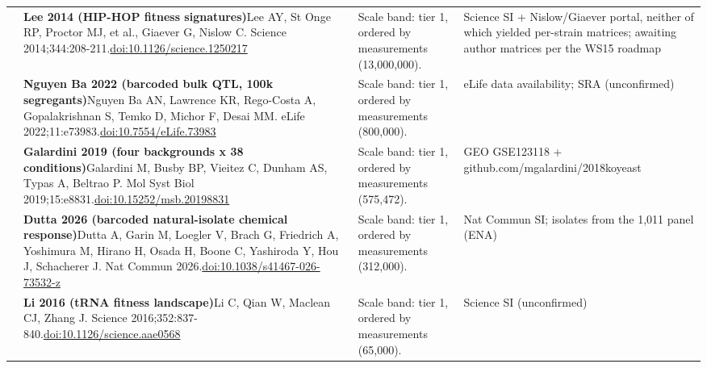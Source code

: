\begin{landscape}
\begin{longtable}{@{}r@{\hspace{4pt}} L{86mm} L{92mm} L{62mm}@{}}
 & \textbf{Lee 2014 (HIP-HOP fitness signatures)}\newline Lee AY, St Onge RP, Proctor MJ, et al., Giaever G, Nislow C. Science 2014;344:208-211.\newline \href{https://doi.org/10.1126/science.1250217}{doi:10.1126/\allowbreak science.1250217} & Scale band: tier 1, ordered by measurements (13,000,000). & Science SI + Nislow/\allowbreak Giaever portal, neither of which yielded per-strain matrices; awaiting author matrices per the WS15 roadmap \\
 & \textbf{Nguyen Ba 2022 (barcoded bulk QTL, 100k segregants)}\newline Nguyen Ba AN, Lawrence KR, Rego-Costa A, Gopalakrishnan S, Temko D, Michor F, Desai MM. eLife 2022;11:e73983.\newline \href{https://doi.org/10.7554/eLife.73983}{doi:10.7554/\allowbreak eLife.73983} & Scale band: tier 1, ordered by measurements (800,000). & eLife data availability; SRA (unconfirmed) \\
 & \textbf{Galardini 2019 (four backgrounds x 38 conditions)}\newline Galardini M, Busby BP, Vieitez C, Dunham AS, Typas A, Beltrao P. Mol Syst Biol 2019;15:e8831.\newline \href{https://doi.org/10.15252/msb.20198831}{doi:10.15252/\allowbreak msb.20198831} & Scale band: tier 1, ordered by measurements (575,472). & GEO GSE123118 + github.com/\allowbreak mgalardini/\allowbreak 2018koyeast \\
 & \textbf{Dutta 2026 (barcoded natural-isolate chemical response)}\newline Dutta A, Garin M, Loegler V, Brach G, Friedrich A, Yoshimura M, Hirano H, Osada H, Boone C, Yashiroda Y, Hou J, Schacherer J. Nat Commun 2026.\newline \href{https://doi.org/10.1038/s41467-026-73532-z}{doi:10.1038/\allowbreak s41467-026-73532-z} & Scale band: tier 1, ordered by measurements (312,000). & Nat Commun SI; isolates from the 1,011 panel (ENA) \\
 & \textbf{Li 2016 (tRNA fitness landscape)}\newline Li C, Qian W, Maclean CJ, Zhang J. Science 2016;352:837-840.\newline \href{https://doi.org/10.1126/science.aae0568}{doi:10.1126/\allowbreak science.aae0568} & Scale band: tier 1, ordered by measurements (65,000). & Science SI (unconfirmed) \\

\end{longtable}
\end{landscape}
